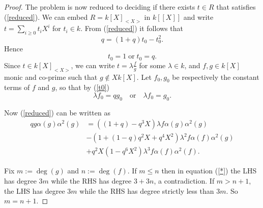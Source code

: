 \documentclass[10pt,a4paper]{amsart}
\begin{document}
\begin{proof}
\noindent The problem is now reduced to deciding if there exists $t\in R$ that satisfies (\ref{reduced}). We can embed $R=k[X]_{<X>}$ in $k[[X]]$ and write $t=\displaystyle \sum_{i\geq 0} t_iX^i$ for $t_i \in k$. From (\ref{reduced}) it follows that
$$q=(1+q)t_0-t_0^2.$$
Hence
\begin{equation}\label{t0}t_0=1 \; \mbox{or}\; t_0=q.
\end{equation}
\noindent Since $t\in k[X]_{<X>}$, we can write $t=\lambda\frac{f}{g}$ for some $\lambda\in k$, and  $f,g\in k[X]$ monic and co-prime such that $g\notin X k[X]$.  Let $f_0, g_0$ be respectively the constant terms of $f$ and $g$, so that by (\ref{t0})
\begin{equation}\label{degree0}
\lambda f_0= qg_0\quad \mbox{or}\quad \lambda f_0=g_0.
\end{equation}


\noindent Now (\ref{reduced}) can be written as
\begin{equation}\label{*}
\begin{split}
qg\alpha(g)\alpha^2(g)&=\left((1+q)-q^3X\right)\lambda f\alpha(g)\alpha^2(g)\\
&-\left(1+(1-q)q^2X+q^4X^2\right)\lambda^2f\alpha(f)\alpha^2(g)\\
&+q^2X(1-q^6X^2)\lambda^3f\alpha(f)\alpha^2(f).
\end{split}
\end{equation}%

\noindent Fix $m := \deg(g)$ and $n := \deg(f)$. If $m\leq n$ then in equation (\ref{*}) the LHS has degree $3m$ while the RHS has degree $3+3n$, a contradiction. If $m>n+1$, the LHS has degree $3m$ while the RHS has degree strictly less than $3m$. So $m=n+1$.

\medskip


\end{proof}
\end{document}
